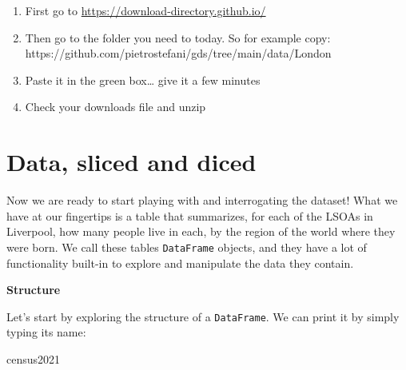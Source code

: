 \documentclass[
  letterpaper,
  DIV=11,
  numbers=noendperiod]{scrreprt}
\newenvironment{Shaded}{\begin{snugshade}}{\end{snugshade}}
\newcommand{\NormalTok}[1]{\textcolor[rgb]{0.00,0.23,0.31}{#1}}
\begin{document}
\begin{tcolorbox}[enhanced jigsaw, breakable, toptitle=1mm, titlerule=0mm, opacityback=0, colback=white, coltitle=black, leftrule=.75mm, bottomtitle=1mm, colframe=quarto-callout-tip-color-frame, colbacktitle=quarto-callout-tip-color!10!white, toprule=.15mm, bottomrule=.15mm, arc=.35mm, rightrule=.15mm, opacitybacktitle=0.6, title=\textcolor{quarto-callout-tip-color}{\faLightbulb}\hspace{0.5em}{Download a folder on github}, left=2mm]

\begin{enumerate}
\def\labelenumi{\arabic{enumi}.}
\item
  First go to \url{https://download-directory.github.io/}
\item
  Then go to the folder you need to today. So for example copy:
  https://github.com/pietrostefani/gds/tree/main/data/London
\item
  Paste it in the green box\ldots{} give it a few minutes
\item
  Check your downloads file and unzip
\end{enumerate}

\end{tcolorbox}

\section*{Data, sliced and diced}\label{data-sliced-and-diced}


Now we are ready to start playing with and interrogating the dataset!
What we have at our fingertips is a table that summarizes, for each of
the LSOAs in Liverpool, how many people live in each, by the region of
the world where they were born. We call these tables \texttt{DataFrame}
objects, and they have a lot of functionality built-in to explore and
manipulate the data they contain.

\textbf{Structure}

Let's start by exploring the structure of a \texttt{DataFrame}. We can
print it by simply typing its name:

\begin{Shaded}
\begin{Highlighting}[]
\NormalTok{census2021}
\end{Highlighting}
\end{Shaded}
\end{document}
